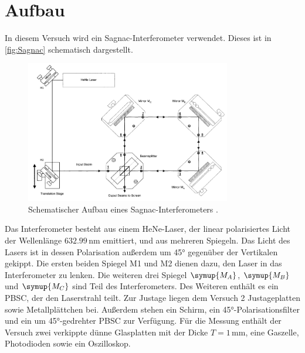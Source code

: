 \section{Aufbau}
\label{sec:Aufbau}
In diesem Versuch wird ein Sagnac-Interferometer verwendet. Dieses ist in \autoref{fig:Sagnac}
schematisch dargestellt. 
\begin{figure}
    \centering
    \includegraphics[width=0.8\textwidth]{Sagnac.png}
    \caption{Schematischer Aufbau eines Sagnac-Interferometers \cite{ap64}.}
    \label{fig:Sagnac}
\end{figure}
Das Interferometer besteht aus einem HeNe-Laser, der linear polarisiertes Licht der Wellenlänge $632.99\,\unit{\nano\meter}$
emittiert, und aus mehreren Spiegeln. Das Licht des Lasers ist in dessen Polarisation außerdem um 45° gegenüber der Vertikalen gekippt.
Die ersten beiden Spiegel M1 und M2 dienen dazu, den Laser in das Interferometer zu lenken. Die weiteren drei Spiegel $\symup{M_A}$, 
$\symup{M_B}$ und $\symup{M_C}$ sind Teil des Interferometers. Des Weiteren enthält es ein PBSC, der den Laserstrahl teilt.
Zur Justage liegen dem Versuch 2 Justageplatten sowie Metallplättchen bei. Außerdem stehen ein Schirm, ein 45°-Polarisationsfilter und ein um 45°-gedrehter
PBSC zur Verfügung. 
Für die Messung enthält der Versuch zwei verkippte dünne Glasplatten mit der Dicke $T=1\,\mathrm{mm}$, eine Gaszelle, Photodioden sowie
ein Oszilloskop.